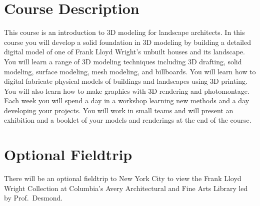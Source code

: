 \documentclass[11pt,article,oneside]{memoir}
\begin{document}
\section{Course Description}
%
This course is an introduction to 3D modeling for landscape architects. 
In this course you will develop a solid foundation in 3D modeling
by building a detailed digital model of one of 
Frank Lloyd Wright's unbuilt houses and its landscape. 
%
You will learn a range of 3D modeling techniques including
3D drafting, solid modeling, surface modeling,  mesh modeling, and billboards. 
%
You will learn how to digital fabricate physical models 
of buildings and landscapes using 3D printing. 
%
You will also learn how to make graphics with
3D rendering and photomontage.
%
Each week you will spend a day in a workshop
learning new methods
and a day developing your projects.
%
You will work in small teams and 
will present an exhibition and a booklet of your
models and renderings at the end of the course.\\

\section{Optional Fieldtrip}
There will be an optional fieldtrip to New York City 
to view the Frank Lloyd Wright Collection 
at Columbia's Avery Architectural and Fine Arts Library 
led by Prof.~Desmond. 

\clearpage

\end{document}

